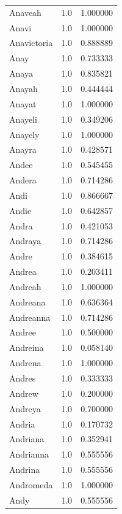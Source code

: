\documentclass[
  letterpaper,
  DIV=11,
  numbers=noendperiod]{scrreprt}
\begin{document}
\begin{tabular}{lrr}
Anaveah         &   1.0 &   1.000000 \\
Anavi           &   1.0 &   1.000000 \\
Anavictoria     &   1.0 &   0.888889 \\
Anay            &   1.0 &   0.733333 \\
Anaya           &   1.0 &   0.835821 \\
Anayah          &   1.0 &   0.444444 \\
Anayat          &   1.0 &   1.000000 \\
Anayeli         &   1.0 &   0.349206 \\
Anayely         &   1.0 &   1.000000 \\
Anayra          &   1.0 &   0.428571 \\
Andee           &   1.0 &   0.545455 \\
Andera          &   1.0 &   0.714286 \\
Andi            &   1.0 &   0.866667 \\
Andie           &   1.0 &   0.642857 \\
Andra           &   1.0 &   0.421053 \\
Andraya         &   1.0 &   0.714286 \\
Andre           &   1.0 &   0.384615 \\
Andrea          &   1.0 &   0.203411 \\
Andreah         &   1.0 &   1.000000 \\
Andreana        &   1.0 &   0.636364 \\
Andreanna       &   1.0 &   0.714286 \\
Andree          &   1.0 &   0.500000 \\
Andreina        &   1.0 &   0.058140 \\
Andrena         &   1.0 &   1.000000 \\
Andres          &   1.0 &   0.333333 \\
Andrew          &   1.0 &   0.200000 \\
Andreya         &   1.0 &   0.700000 \\
Andria          &   1.0 &   0.170732 \\
Andriana        &   1.0 &   0.352941 \\
Andrianna       &   1.0 &   0.555556 \\
Andrina         &   1.0 &   0.555556 \\
Andromeda       &   1.0 &   1.000000 \\
Andy            &   1.0 &   0.555556 \\

\end{tabular}
\end{document}
